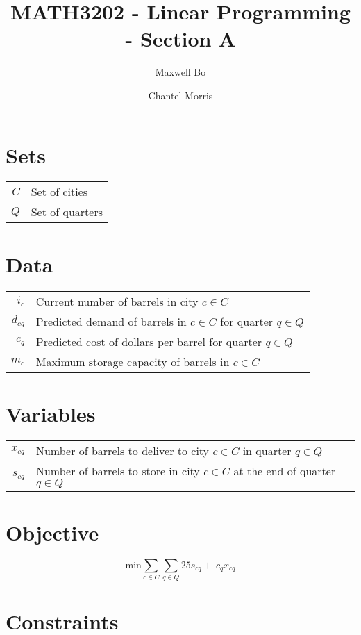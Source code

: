 \documentclass[a4paper]{article}
\title{MATH3202 - Linear Programming - Section A}
\author{Maxwell Bo  \and Chantel Morris}
\begin{document}
 

\maketitle

\section*{Sets}

\begin{tabular}{rl}
    $C$ & Set of cities\\
    $Q$ & Set of quarters
\end{tabular}

\section*{Data}

\begin{tabular}{rl}
    $i_c$ & Current number of barrels in city $c \in C$\\
    $d_{cq}$ & Predicted demand of barrels in $c \in C$ for quarter $q \in Q$\\
    $c_q$ & Predicted cost of dollars per barrel for quarter $q \in Q$\\
    $m_c$ & Maximum storage capacity of barrels in $c \in C$
\end{tabular}

\section*{Variables}

\begin{tabular}{rl}
    $x_{cq}$ & Number of barrels to deliver to city $c \in C$ in quarter $q \in Q$\\
    $s_{cq}$ & Number of barrels to store in city $c \in C$ at the end of quarter $q \in Q$\\
\end{tabular}

\section*{Objective}

\[
\text{min} \sum_{c \in C}\sum_{q \in Q} 25 s_{cq} +\: c_q x_{cq}
\]

\section*{Constraints}
\end{document}
